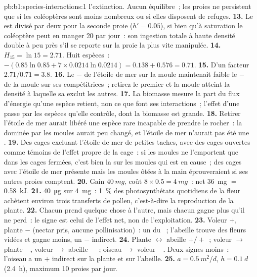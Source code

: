 \begin{solution}{pb:b1:species-interactions:1}
l'extinction. Aucun équilibre~; les proies ne persistent que si les
coléoptères sont moins nombreux ou si elles disposent de refuges.
\textbf{13.} Le  est divisé par deux pour la
seconde proie ($h' = 0.05$), si bien qu'à saturation le coléoptère peut
en manger 20 par jour~: son ingestion totale à haute densité double à
peu près s'il se reporte sur la proie la plus vite manipulée.
\textbf{14.} $H_{15} = \ln 15 = 2.71$. Huit espèces~: $-(0.85\ln 0.85
+ 7\times 0.0214\ln 0.0214) = 0.138 + 0.576 = 0.71$.
\textbf{15.} D'un facteur $2.71/0.71 = 3.8$.
\textbf{16.} Le $-$ de l'étoile de mer sur la moule maintenait faible
le $-$ de la moule sur ses compétitrices~; retirez le premier et la
moule atteint la densité à laquelle sa  exclut les autres.
\textbf{17.} La biomasse mesure la part du flux d'énergie qu'une espèce
retient, non ce que font ses interactions~; l'effet d'une  passe par les espèces qu'elle contrôle, dont la biomasse est
grande.
\textbf{18.} Retirer l'étoile de mer aurait libéré une espèce rare
incapable de prendre le rocher~: la  dominée par les moules
aurait peu changé, et l'étoile de mer n'aurait pas été une .
\textbf{19.} Des cages excluant l'étoile de mer de petites taches, avec
des cages ouvertes comme témoins de l'effet propre de la cage~: si les
moules ne l'emportent que dans les cages fermées, c'est bien la
 sur les moules qui est en cause~; des cages avec l'étoile de
mer présente mais les moules ôtées à la main éprouveraient si ses
autres proies comptent.
\textbf{20.} Gain $\qty{40}{mg}$, coût $8\times 0.5 = \qty{4}{mg}$~: net
\qty{36}{mg} $=$ \qty{0.58}{kJ}.
\textbf{21.} \qty{40}{\micro g} sur \qty{4}{mg}~: \qty{1}{\%} des
photosynthétats quotidiens de la fleur achètent environ trois
transferts de pollen, c'est-à-dire la reproduction de la plante.
\textbf{22.} Chacun prend quelque chose à l'autre, mais chacun gagne
plus qu'il ne perd~: le signe est celui de l'effet net, non de
l'exploitation.
\textbf{23.} Voleur $+$, plante $-$ (nectar pris, aucune
pollinisation)~: un  du ~; l'abeille trouve des
fleurs vidées et gagne moins, un $-$ indirect.
\textbf{24.} Plante $\leftrightarrow$ abeille $+/+$~; voleur $\to$ plante $-$,
voleur $\to$ abeille $-$~; oiseau $\to$ voleur $-$. Deux signes moins~:
l'oiseau a un $+$ indirect sur la plante et sur l'abeille.
\textbf{25.} $a = \qty{0.5}{m^2/d}$, $h = \qty{0.1}{d}$ (\qty{2.4}{h}),
maximum \num{10} proies par jour.
\end{solution}

